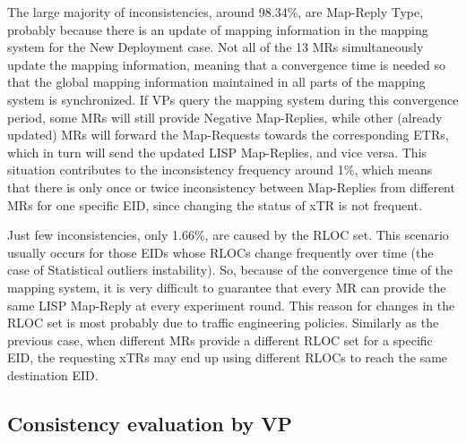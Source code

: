 The large majority of inconsistencies, around 98.34\%, are Map-Reply Type, probably because there is an update of mapping information in the mapping system for the New Deployment case. Not all of the 13 MRs simultaneously update the mapping information, meaning that a convergence time is needed so that the global mapping information maintained in all parts of the mapping system is synchronized. If VPs query the mapping system during this convergence period, some MRs will still provide Negative Map-Replies, while other (already updated) MRs will forward the Map-Requests towards the corresponding ETRs, which in turn will send the updated LISP Map-Replies, and vice versa. This situation contributes to the inconsistency frequency around 1\%, which means that there is only once or twice inconsistency between Map-Replies from different MRs for one specific EID, since changing the status of xTR is not frequent.

Just few inconsistencies, only 1.66\%, are caused by the RLOC set. This scenario usually occurs for those EIDs whose RLOCs change frequently over time (the case of Statistical outliers instability). So, because of the convergence time of the mapping system, it is very difficult to guarantee that every MR can provide the same LISP Map-Reply at every experiment round. This reason for changes in the RLOC set is most probably due to traffic engineering policies. Similarly as the previous case, when different MRs provide a different RLOC set for a specific EID, the requesting xTRs may end up using different RLOCs to reach the same destination EID.
 

\subsection{Consistency evaluation by VP}
\label{subsec:mds_consistency_VP}

